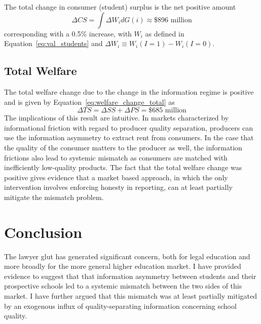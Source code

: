 \documentclass[12pt]{article}
\theoremstyle{definition}
\begin{document}
The total change in consumer (student) surplus is the net positive amount
\begin{equation}
  \Delta CS = \int \Delta W_i dG(i) \approx \$896\text{ million}
  \label{eq:welfare_change_students}
\end{equation}
corresponding with a 0.5\% increase, with $W_i$ as defined in Equation~\eqref{eq:val_students} and $\Delta W_i \equiv W_i(I=1) - W_i(I=0)$.


\subsection{Total Welfare}
\label{sec:welfare_total}

The total welfare change due to the change in the information regime is positive and is given by Equation~\eqref{eq:welfare_change_total} as
\begin{equation}
  \Delta TS = \Delta SS + \Delta PS = \$685\text{ million}
  \label{eq:welfare_change_total}
\end{equation}
The implications of this result are intuitive. In markets characterized by informational friction with regard to producer quality separation, producers can use the information asymmetry to extract rent from consumers. In the case that the quality of the consumer matters to the producer as well, the information frictions also lead to systemic mismatch as consumers are matched with inefficiently low-quality products. The fact that the total welfare change was positive gives evidence that a market based approach, in which the only intervention involves enforcing honesty in reporting, can at least partially mitigate the mismatch problem.

\section{Conclusion}

The lawyer glut has generated significant concern, both for legal education and more broadly for the more general higher education market. I have provided evidence to suggest that that information asymmetry between students and their prospective schools led to a systemic mismatch between the two sides of this market. I have further argued that this mismatch was at least partially mitigated by an exogenous influx of quality-separating information concerning school quality.
\end{document}
